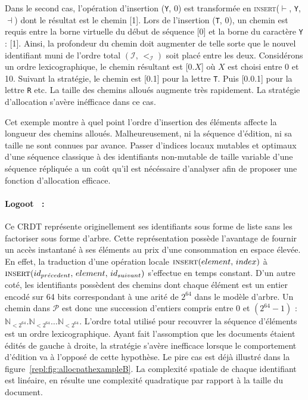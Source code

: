 Dans le second cas, l'opération d'insertion (\texttt{Y}, 0) est transformée en
\textsc{insert}($\vdash$, \texttt{Y}, $\dashv$) dont le résultat est le chemin
[1]. Lors de l'insertion (\texttt{T}, 0), un chemin est requis entre la borne
virtuelle du début de séquence [0] et la borne du caractère \texttt{Y} :
[1]. Ainsi, la profondeur du chemin doit augmenter de telle sorte que le nouvel
identifiant muni de l'ordre total $(\mathcal{I},\,<_\mathcal{I})$ soit placé
entre les deux. Considérons un ordre lexicographique, le chemin résultant est
[0.$X$] où $X$ est choisi entre 0 et 10. Suivant la stratégie, le chemin est
[0.1] pour la lettre \texttt{T}. Puis [0.0.1] pour la lettre \texttt{R} etc. La
taille des chemins alloués augmente très rapidement.  La stratégie d'allocation
s'avère inéfficace dans ce cas.

Cet exemple montre à quel point l'ordre d'insertion des éléments affecte la
longueur des chemins alloués. Malheureusement, ni la séquence d'édition, ni sa
taille ne sont connues par avance.  Passer d'indices locaux mutables et optimaux
d'une séquence classique à des identifiants non-mutable de taille variable d'une
séquence répliquée a un coût qu'il est nécéssaire d'analyser afin de proposer
une fonction d'allocation efficace.

\paragraph{Logoot~\cite{weiss2010collaborative, weiss2009logoot,
    weiss2010logootundo} :} Ce CRDT représente originellement ses identifiants
sous forme de liste sans les factoriser sous forme d'arbre. Cette représentation
possède l'avantage de fournir un accès instantané à ses éléments au prix d'une
consommation en espace élevée. En effet, la traduction d'une opération locale
$\textsc{insert}(element,\, index)$ à
$\textsc{insert}(id_{pr\acute{e}cedent},\, element,\, id_{suivant})$ s'effectue
en temps constant. D'un autre coté, les identifiants possèdent des chemins dont
chaque élément est un entier encodé sur 64 bits correspondant à une arité de
$2^{64}$ dans le modèle d'arbre. Un chemin dans $\mathcal{P}$ est donc une
succession d'entiers compris entre 0 et $(2^{64}-1)$ :
$\mathbb{N}_{<2^{64}}.\mathbb{N}_{<2^{64}}\ldots\mathbb{N}_{<2^{64}}$.  L'ordre
total utilisé pour recouvrer la séquence d'éléments est un ordre
lexicographique. Ayant fait l'assomption que les documents étaient édités de
gauche à droite, la stratégie s'avère inefficace lorsque le comportement
d'édition va à l'opposé de cette hypothèse. Le pire cas est déjà illustré dans
la figure~\ref{repl:fig:allocpathexampleB}. La complexité spatiale de chaque
identifiant est linéaire, en résulte une complexité quadratique par rapport à la
taille du document.

